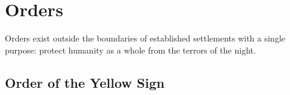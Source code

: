 \documentclass[././main.tex]{subfiles}
\begin{document}
\section{Orders}
Orders exist outside the boundaries of established settlements with a single purpose: protect humanity as a whole from the terrors of the night.

\subsection{Order of the Yellow Sign}
\end{document}
